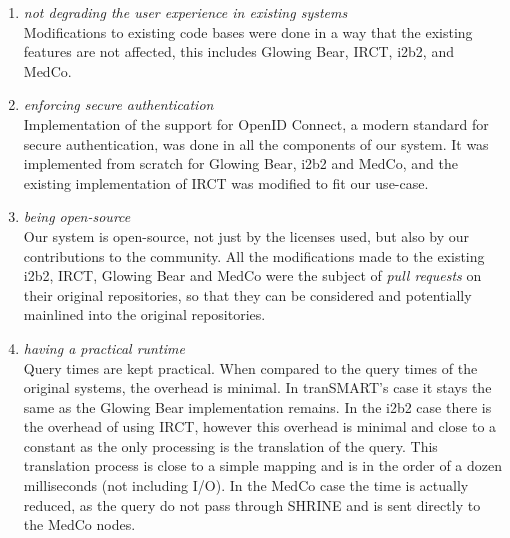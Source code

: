 \begin{enumerate}
\begin{enumerate}
        \item \emph{not degrading the user experience in existing systems} \\
        Modifications to existing code bases were done in a way that the existing features are not affected, this includes Glowing Bear, IRCT, i2b2, and MedCo.
        
        \item \emph{enforcing secure authentication} \\
        Implementation of the support for OpenID Connect, a modern standard for secure authentication, was done in all the components of our system.
        It was implemented from scratch for Glowing Bear, i2b2 and MedCo, and the existing implementation of IRCT was modified to fit our use-case.
        
        \item \emph{being open-source} \\
        Our system is open-source, not just by the licenses used, but also by our contributions to the community.
        All the modifications made to the existing i2b2, IRCT, Glowing Bear and MedCo were the subject of \emph{pull requests} on their original repositories, so that they can be considered and potentially mainlined into the original repositories.
        
        \item \emph{having a practical runtime} \\
        Query times are kept practical.
        When compared to the query times of the original systems, the overhead is minimal.
        In tranSMART's case it stays the same as the Glowing Bear implementation remains.
        In the i2b2 case there is the overhead of using IRCT, however this overhead is minimal and close to a constant as the only processing is the translation of the query. 
        This translation process is close to a simple mapping and is in the order of a dozen milliseconds (not including I/O).
        In the MedCo case the time is actually reduced, as the query do not pass through SHRINE and is sent directly to the MedCo nodes.
        
        
    \end{enumerate}








\end{enumerate}
